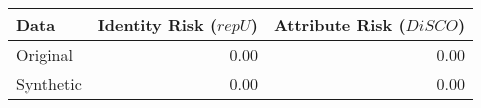\begin{tabular}{lrr}
  \toprule
Data & Identity Risk ($repU$) & Attribute Risk ($DiSCO$) \\ 
  \midrule
Original & 0.00 & 0.00 \\ 
  Synthetic & 0.00 & 0.00 \\ 
   \bottomrule
\end{tabular}
